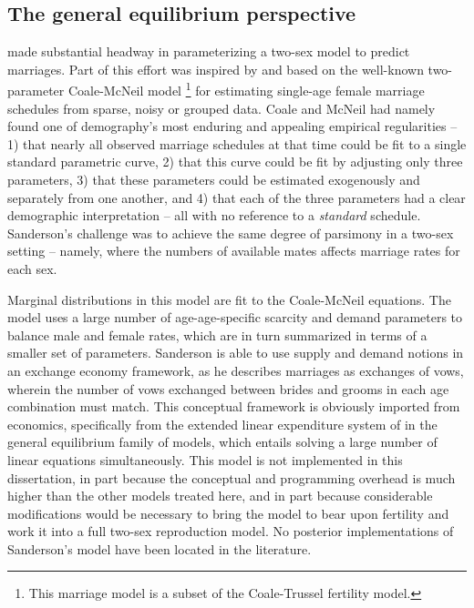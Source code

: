 \subsection{The general equilibrium perspective} 
\citet{marriage1981warren,
sanderson1983two} made substantial headway in parameterizing a two-sex
 model to predict marriages. Part of this effort was
inspired by and based on the well-known two-parameter Coale-McNeil
model \citep{coale1972distribution, coale1971age}\footnote{This marriage model
is a subset of the Coale-Trussel fertility model.} for estimating
single-age female marriage schedules from sparse, noisy or grouped
data. Coale and McNeil had namely found one of demography's most enduring 
and appealing empirical regularities -- 1) that nearly 
all observed marriage schedules at that time could be fit to a single standard parametric
curve, 2) that this curve could be fit by adjusting only three parameters, 3)
that these parameters could be estimated exogenously and separately from one
another, and 4) that each of the three parameters had a clear demographic
interpretation -- all with no reference to a \textit{standard}
schedule. Sanderson's challenge was to achieve the same degree of parsimony in a
two-sex setting -- namely, where the numbers of available mates affects marriage
rates for each sex. 

Marginal distributions in this model are fit to the
Coale-McNeil equations. The model uses a large number of
age-age-specific scarcity and demand parameters to balance male and female
rates, which are in turn summarized in terms of a smaller set of parameters.
Sanderson is able to use supply and demand notions in an exchange economy
framework, as he describes marriages as exchanges of vows, wherein the number
of vows exchanged between brides and grooms in each age combination must
match. This conceptual framework is obviously imported from economics,
specifically from the extended linear expenditure system of
\citet{lluch1977patterns} in the general equilibrium family of models, 
which entails solving a large number of linear
equations simultaneously. This model is not implemented in this dissertation, 
in part because the conceptual and programming overhead is much higher
than the other models treated here, and in part because considerable
modifications would be necessary to bring the model to bear upon fertility and
work it into a full two-sex reproduction model. No posterior implementations of
Sanderson's model have been located in the literature.


